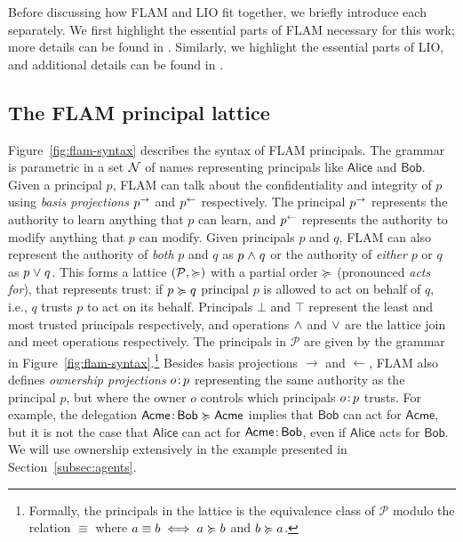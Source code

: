 Before discussing how FLAM and LIO fit together, we briefly introduce each separately. We first highlight the essential parts of FLAM necessary for this work; more details can be found in \textcite{Arden:2015:FA:2859845.2859998}. Similarly, we highlight the essential parts of LIO, and additional details can be found in \textcite{SRMMlio}.

\subsection{The FLAM principal lattice}
Figure~\ref{fig:flam-syntax} describes the syntax of FLAM principals. The grammar is parametric in a set $\mathcal{N}$ of names representing principals like $\mathsf{Alice}$ and $\mathsf{Bob}$. Given a principal $p$, FLAM can talk about the confidentiality and integrity of $p$ using \emph{basis projections} $p^{\rightarrow}$ and $p^{\leftarrow}$ respectively. The principal $p^{\rightarrow}$ represents the authority to learn anything that $p$ can learn, and $p^{\leftarrow}$ represents the authority to modify anything that $p$ can modify. Given principals $p$ and $q$, FLAM can also represent the authority of \emph{both} $p$ and $q$ as $p \mathrel{\land} q$ or the authority of \emph{either} $p$ or $q$ as $p \mathrel{\lor} q$. This forms a lattice $(\mathcal{P}, \succcurlyeq)$ with a partial order $\succcurlyeq$ (pronounced \emph{acts for}), that represents trust: if $p \succcurlyeq q$ principal $p$ is allowed to act on behalf of $q$, i.e., $q$ trusts $p$ to act on its behalf. Principals $\bot$ and $\top$ represent the least and most trusted principals respectively, and operations $\mathrel{\land}$ and $\mathrel{\lor}$ are the lattice join and meet operations respectively. The principals in $\mathcal{P}$ are given by the grammar in Figure~\ref{fig:flam-syntax}.\footnote{Formally, the principals in the lattice is the equivalence class of $\mathcal{P}$ modulo the relation $\equiv$ where $a \equiv b \iff a \succcurlyeq b$ and $b \succcurlyeq a$.} Besides basis projections $\rightarrow$ and $\leftarrow$, FLAM also defines \emph{ownership projections} $o \colon \!p$ representing the same authority as the principal $p$, but where the owner $o$ controls which principals $o \colon \!p$ trusts. For example, the delegation $\mathsf{Acme} \colon \!\mathsf{Bob} \succcurlyeq \mathsf{Acme}$ implies that $\mathsf{Bob}$ can act for $\mathsf{Acme}$, but it is not the case that $\mathsf{Alice}$ can act for $\mathsf{Acme} \colon \!\mathsf{Bob}$, even if $\mathsf{Alice}$ acts for $\mathsf{Bob}$. We will use ownership extensively in the example presented in Section~\ref{subsec:agents}.

